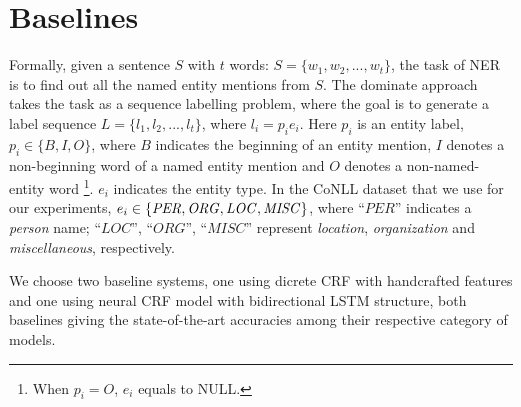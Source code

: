 \documentclass[11pt,a4paper]{article}
\begin{document}
\begin{table}[t]
\begin{center}
\end{center}
\caption{Features of discrete \textit{CRF} for NER, $i\in\{-1,0 \}$.}
\label{tab:features}
\end{table}

\section{Baselines}
Formally, given a sentence $S$ with $t$ words: $S=\{w_1,w_2,...,w_t\}$, the task of NER is to find out all the named entity mentions from $S$. The dominate approach takes the task as a sequence labelling problem, where the goal is to generate a label sequence $L = \{l_1, l_2, ..., l_t\}$, where $l_i = p_i e_i$. Here $p_i$ is an entity label, $p_i \in \{B, I, O\}$, where $B$ indicates the beginning of an entity mention, $I$ denotes a non-beginning word of a named entity mention and $O$ denotes a non-named-entity word \footnote{When $p_i=O$, $e_i$ equals to NULL.}. $e_i$ indicates the entity type. In the CoNLL dataset that we use for our experiments,
 $e_i \in\{ \it PER, ORG, LOC, MISC\} $, where ``$PER$'' indicates a \textit{person} name; ``$LOC$'', ``$ORG$'', ``$MISC$'' represent \textit{location}, \textit{organization} and \textit{miscellaneous}, respectively.

We choose two baseline systems, one using dicrete CRF with handcrafted features and one using neural CRF model with bidirectional LSTM structure, both baselines giving the state-of-the-art accuracies among their respective category of models.
\end{document}
